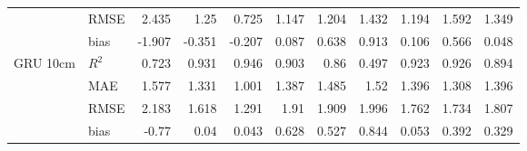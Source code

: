 \begin{tabular}{llrrrrrrrrr}
                                     & RMSE  &  2.435 &  1.25  &  0.725 & 1.147 & 1.204 &  1.432 &  1.194 & 1.592 &     1.349 \\
                                     & bias  & -1.907 & -0.351 & -0.207 & 0.087 & 0.638 &  0.913 &  0.106 & 0.566 &     0.048 \\
 GRU 10cm                            & $R^2$ &  0.723 &  0.931 &  0.946 & 0.903 & 0.86  &  0.497 &  0.923 & 0.926 &     0.894 \\
                                     & MAE   &  1.577 &  1.331 &  1.001 & 1.387 & 1.485 &  1.52  &  1.396 & 1.308 &     1.396 \\
                                     & RMSE  &  2.183 &  1.618 &  1.291 & 1.91  & 1.909 &  1.996 &  1.762 & 1.734 &     1.807 \\
                                     & bias  & -0.77  &  0.04  &  0.043 & 0.628 & 0.527 &  0.844 &  0.053 & 0.392 &     0.329 \\
\hline
\end{tabular}